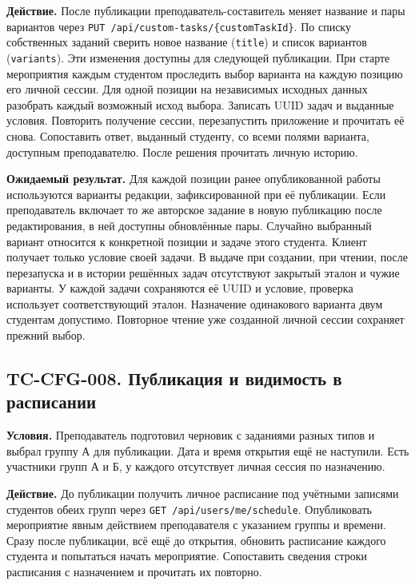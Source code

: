 \documentclass[12pt,a4paper]{article}
\begin{document}
\textbf{Действие.} После публикации преподаватель-составитель меняет название и пары вариантов через \texttt{PUT /\allowbreak{}api/\allowbreak{}custom-\allowbreak{}tasks/\allowbreak{}\{custom\allowbreak{}Task\allowbreak{}Id\}}. По списку собственных заданий сверить новое название (\texttt{title}) и список вариантов (\texttt{variants}). Эти изменения доступны для следующей публикации. При старте мероприятия каждым студентом проследить выбор варианта на каждую позицию его личной сессии. Для одной позиции на независимых исходных данных разобрать каждый возможный исход выбора. Записать UUID задач и выданные условия. Повторить получение сессии, перезапустить приложение и прочитать её снова. Сопоставить ответ, выданный студенту, со всеми полями варианта, доступным преподавателю. После решения прочитать личную историю.

\textbf{Ожидаемый результат.} Для каждой позиции ранее опубликованной работы используются варианты редакции, зафиксированной при её публикации. Если преподаватель включает то же авторское задание в новую публикацию после редактирования, в ней доступны обновлённые пары. Случайно выбранный вариант относится к конкретной позиции и задаче этого студента. Клиент получает только условие своей задачи. В выдаче при создании, при чтении, после перезапуска и в истории решённых задач отсутствуют закрытый эталон и чужие варианты. У каждой задачи сохраняются её UUID и условие, проверка использует соответствующий эталон. Назначение одинакового варианта двум студентам допустимо. Повторное чтение уже созданной личной сессии сохраняет прежний выбор.

\subsection{TC-CFG-008. Публикация и видимость в расписании}\label{tc-cfg-008-ux43fux443ux431ux43bux438ux43aux430ux446ux438ux44f-ux438-ux432ux438ux434ux438ux43cux43eux441ux442ux44c-ux432-ux440ux430ux441ux43fux438ux441ux430ux43dux438ux438}

\hypertarget{tc-cfg-008-публикация-и-видимость-в-расписании}{}

\hypertarget{tc-cfg-008}{}

\textbf{Условия.} Преподаватель подготовил черновик с заданиями разных типов и выбрал группу А для публикации. Дата и время открытия ещё не наступили. Есть участники групп А и Б, у каждого отсутствует личная сессия по назначению.

\textbf{Действие.} До публикации получить личное расписание под учётными записями студентов обеих групп через \texttt{GET /\allowbreak{}api/\allowbreak{}users/\allowbreak{}me/\allowbreak{}schedule}. Опубликовать мероприятие явным действием преподавателя с указанием группы и времени. Сразу после публикации, всё ещё до открытия, обновить расписание каждого студента и попытаться начать мероприятие. Сопоставить сведения строки расписания с назначением и прочитать их повторно.
\end{document}
